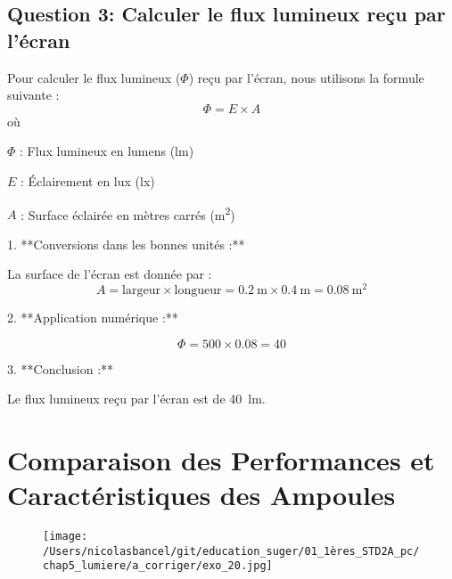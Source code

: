 \documentclass[answers]{exam}
\begin{document}
\begin{solution}
\subsection*{Question 3: Calculer le flux lumineux reçu par l'écran}

\begin{questions}
Pour calculer le flux lumineux ($\Phi$) reçu par l'écran, nous utilisons la formule suivante :
\[
\Phi = E \times A
\]
où
\begin{addmargin}[4em]{1em}
\begin{compactitem}
    \item [$\Phi$] : Flux lumineux en lumens (lm)
    \item [$E$] : Éclairement en lux (lx)
    \item [$A$] : Surface éclairée en mètres carrés (\si{\meter\squared})
\end{compactitem}
\end{addmargin}

1. **Conversions dans les bonnes unités :**

   La surface de l'écran est donnée par :
   \[
   A = \text{largeur} \times \text{longueur} = \SI{0.2}{\meter} \times \SI{0.4}{\meter} = \SI{0.08}{\meter\squared}
   \]

2. **Application numérique :**

   \[
   \Phi = 500 \times 0.08 = 40
   \]

3. **Conclusion :** 

   Le flux lumineux reçu par l'écran est de \SI{40}{\lumen}.
\end{questions}

\end{solution}



\section*{Comparaison des Performances et Caractéristiques des Ampoules}

    \begin{figure}[H]
      \centering
      \texttt{[image: /Users/nicolasbancel/git/education\_suger/01\_1ères\_STD2A\_pc/chap5\_lumiere/a\_corriger/exo\_20.jpg]}
      \captionsetup{labelformat=empty}
    \end{figure}
\end{document}
